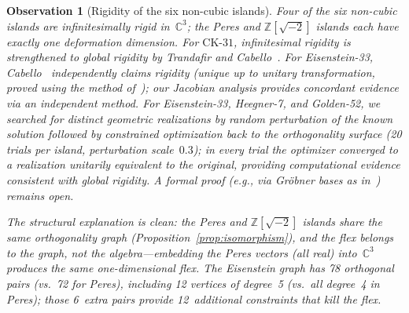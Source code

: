 \documentclass[12pt,a4paper]{article}
\newtheorem{observation}[theorem]{Observation}
\newcommand{\C}{\mathbb{C}}
\newcommand{\Z}{\mathbb{Z}}
\newcommand{\CK}{\mathrm{CK}\text{-}31}
\begin{document}
\begin{observation}[Rigidity of the six non-cubic islands]
Four of the six non-cubic islands are infinitesimally rigid in~$\C^3$; the Peres and $\Z[\sqrt{-2}]$ islands each have exactly one deformation dimension.  For $\CK$, infinitesimal rigidity is strengthened to global rigidity by Trandafir and Cabello~\cite{TrandafirCabello2025}.  For Eisenstein-33, Cabello~\cite{Cabello2025simplest} independently claims rigidity (unique up to unitary transformation, proved using the method of~\cite{TrandafirCabello2025}); our Jacobian analysis provides concordant evidence via an independent method.  For Eisenstein-33, Heegner-7, and Golden-52, we searched for distinct geometric realizations by random perturbation of the known solution followed by constrained optimization back to the orthogonality surface (20 trials per island, perturbation scale~$0.3$); in every trial the optimizer converged to a realization unitarily equivalent to the original, providing computational evidence consistent with global rigidity.  A formal proof (e.g., via Gr\"obner bases as in~\cite{TrandafirCabello2025}) remains open.

The structural explanation is clean: the Peres and $\Z[\sqrt{-2}]$ islands share the same orthogonality graph (Proposition~\ref{prop:isomorphism}), and the flex belongs to the \emph{graph}, not the algebra---embedding the Peres vectors (all real) into~$\C^3$ produces the same one-dimensional flex.  The Eisenstein graph has 78 orthogonal pairs (vs.\ 72 for Peres), including 12 vertices of degree~5 (vs.\ all degree~4 in Peres); those 6~extra pairs provide 12~additional constraints that kill the flex.


\end{observation}
\end{document}

